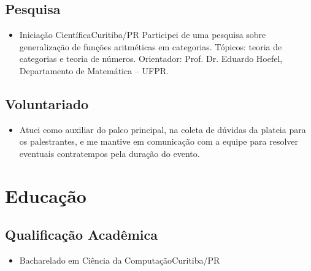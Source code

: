 \documentclass[a4paper, 12pt]{moderncv}
\begin{document}
\subsection{\small{Pesquisa}}
\begin{itemize}
    \item{
        {Iniciação Científica}{Curitiba/PR}{}
        {Participei de uma pesquisa sobre generalização de funções aritméticas em
         categorias. Tópicos: teoria de categorias e teoria de números. Orientador:
         Prof. Dr. Eduardo Hoefel, Departamento de Matemática -- UFPR.}}
\end{itemize}

\vspace{4pt}
\subsection{\small{Voluntariado}}
\begin{itemize}
    \item{
            {\vspace{3pt}Atuei como auxiliar do palco principal, na coleta de dúvidas
                da plateia para os palestrantes, e me mantive em comunicação com a equipe
            para resolver eventuais contratempos pela duração do evento.}}
        \vspace{4pt}
\end{itemize}
\vspace{4pt}

\section{Educação}
\vspace{1pt}
\subsection{\small{Qualificação Acadêmica}}
\vspace{2pt}
\begin{itemize}
    \item{
        {Bacharelado em Ciência da Computação}{Curitiba/PR}{}{}}
\end{itemize}
\vspace{4pt}
\end{document}
